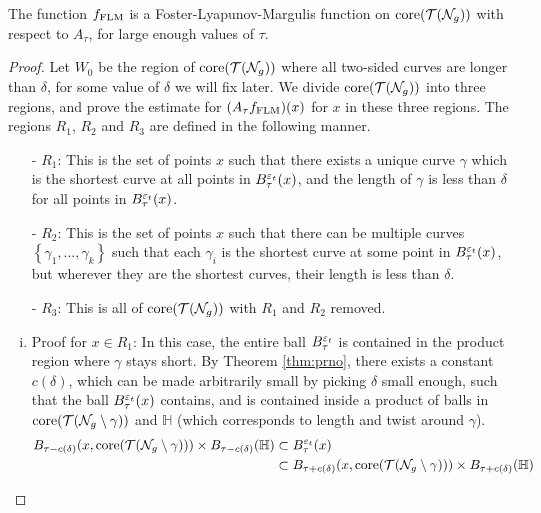 \documentclass[12pt, reqno]{amsart}
\begin{document}
\begin{proposition}
  \label{prop:flm-is-flm}
  The function $f_{\mathrm{FLM}}$ is a Foster-Lyapunov-Margulis function on $\mathrm{core}(\mathcal{T}(\mathcal{N}_g))$ with respect to $A_{\tau}$, for large enough values of $\tau$.
\end{proposition}

\begin{proof}
  Let $W_0$ be the region of $\mathrm{core}(\mathcal{T}(\mathcal{N}_g))$ where all two-sided curves are longer than $\delta$, for some value of $\delta$ we will fix later.
  We divide $\mathrm{core}(\mathcal{T}(\mathcal{N}_g))$ into three regions, and prove the estimate for $(A_\tau f_{\mathrm{FLM}})(x)$ for $x$ in these three regions.
  The regions $R_1$, $R_2$ and $R_3$ are defined in the following manner.
  \begin{itemize}
  \item[-] $R_1$: This is the set of points $x$ such that there exists a unique curve $\gamma$ which is the shortest curve at all points in $B_{\tau}^{\varepsilon_t}(x)$, and the length of $\gamma$ is less than $\delta$ for all points in $B_{\tau}^{\varepsilon_t}(x)$.
  \item[-] $R_2$: This is the set of points $x$ such that there can be multiple curves $\left\{ \gamma_1, \ldots, \gamma_k \right\}$ such that each $\gamma_i$ is the shortest curve at some point in $B_{\tau}^{\varepsilon_t}(x)$, but wherever they are the shortest curves, their length is less than $\delta$.
  \item[-] $R_3$: This is all of $\mathrm{core}(\mathcal{T}(\mathcal{N}_g))$ with $R_1$ and $R_2$ removed.
\end{itemize}
  \begin{enumerate}[(i)]
  \item Proof for $x \in R_1$: In this case, the entire ball $B_{\tau}^{\varepsilon_t}$ is contained in the product region where $\gamma$ stays short.
    By Theorem \ref{thm:prno}, there exists a constant $c(\delta)$, which can be made arbitrarily small by picking $\delta$ small enough, such that the ball $B_{\tau}^{\varepsilon_t}(x)$ contains, and is contained inside a product of balls in $\mathrm{core}(\mathcal{T}(\mathcal{N}_g \setminus \gamma))$ and $\mathbb{H}$ (which corresponds to length and twist around $\gamma$).
    \begin{align*}
      B_{\tau - c(\delta)}(x, \mathrm{core}(\mathcal{T}(\mathcal{N}_g \setminus \gamma))) \times B_{\tau - c(\delta)}(\mathbb{H}) &\subset B_{\tau}^{\varepsilon_t}(x) \\
      &\subset B_{\tau + c(\delta)}(x, \mathrm{core}(\mathcal{T}(\mathcal{N}_g \setminus \gamma))) \times B_{\tau + c(\delta)}(\mathbb{H})
    \end{align*}

\end{enumerate}
\end{proof}
\end{document}
